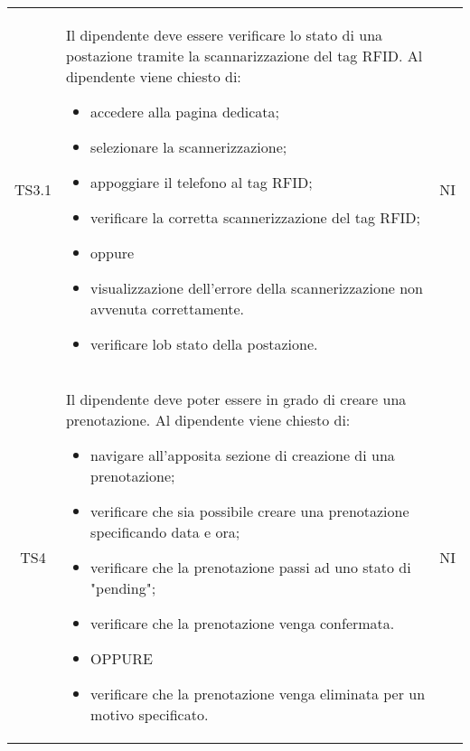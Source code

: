 {\begin{longtable}{ c C{11cm} c }
        TS3.1&
        \begin{flushleft}
            Il dipendente deve essere verificare lo stato di una postazione tramite la scannarizzazione del tag RFID.\newline
            Al dipendente viene chiesto di:
        \end{flushleft}
        \begin{itemize}
            \item accedere alla pagina dedicata;
            \item selezionare la scannerizzazione;
            \item appoggiare il telefono al tag RFID;
            \item verificare la corretta scannerizzazione del tag RFID;
            \item [] oppure
            \item visualizzazione dell'errore della scannerizzazione non avvenuta correttamente.
            \item verificare lob stato della postazione.
        \end{itemize}&
        NI\\


        TS4&
        \begin{flushleft}
            Il dipendente deve poter essere in grado di creare una prenotazione.
            Al dipendente viene chiesto di:
        \end{flushleft}
        \begin{itemize}
            \item navigare all'apposita sezione di creazione di una prenotazione;
            \item verificare che sia possibile creare una prenotazione specificando data e ora;
            \item verificare che la prenotazione passi ad uno stato di "pending";
            \item verificare che la prenotazione venga confermata.
            \item [] OPPURE
            \item verificare che la prenotazione venga eliminata per un motivo specificato.
        \end{itemize}&
        NI\\


\end{longtable}}

